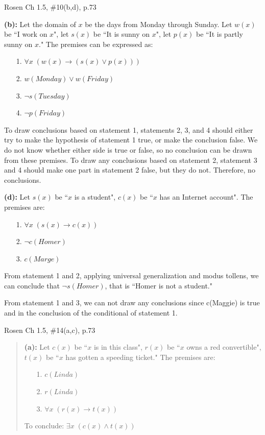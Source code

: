 \documentclass[12pt]{exam}
\begin{document}
\begin{questions}
\question[12] Rosen Ch 1.5, \#10(b,d), p.73
    \begin{solution}
    \textbf{(b):} Let the domain of $x$ be the days from Monday through Sunday.  Let $w(x)$ be ``I work on $x$", let $s(x)$ be ``It is sunny on $x$", let $p(x)$ be ``It is partly sunny on $x$."  The premises can be expressed as:
    \begin{itemize}
        \item[1.] $\forall x\; (w(x) \rightarrow (s(x) \vee p(x)))$
        \item[2.] $w(Monday) \vee w(Friday)$
        \item[3.] $\neg s(Tuesday)$
        \item[4.] $\neg p(Friday)$
    \end{itemize}
    \smallskip
    To draw conclusions based on statement 1, statements 2, 3, and 4 should either try to make the hypothesis of statement 1 true, or make the conclusion false.  We do not know whether either side is true or false, so no conclusion can be drawn from these premises.  To draw any conclusions based on statement 2, statement 3 and 4 should make one part in statement 2 false, but they do not.  Therefore, no conclusions.

    \medskip
    \textbf{(d):} Let $s(x)$ be ``$x$ is a student", $c(x)$ be ``$x$ has an Internet account".  The premises are:
    \begin{itemize}
        \item[1.] $\forall x\; (s(x) \rightarrow c(x))$
        \item[2.] $\neg c(Homer)$
        \item[3.] $c(Marge)$
    \end{itemize}
    \smallskip
    From statement 1 and 2, applying universal generalization and modus tollens, we can conclude that $\neg s(Homer)$, that is ``Homer is not a student."

    From statement 1 and 3, we can not draw any conclusions since c(Maggie) is true and in the conclusion of the conditional of statement 1.
    \end{solution}


\question[12] Rosen Ch 1.5, \#14(a,c), p.73
\begin{solution}
\begin{quote}
    \textbf{(a):} Let $c(x)$ be ``$x$ is in this class", $r(x)$ be ``$x$ owns a red convertible", $t(x)$ be ``$x$ has gotten a speeding ticket."  The premises are:
    \begin{itemize}
        \item[1.] $c(Linda)$
        \item[2.] $r(Linda)$
        \item[3.] $\forall x\; (r(x) \rightarrow t(x))$
    \end{itemize}
    To conclude: $\exists x\; (c(x) \wedge t(x))$


\end{quote}
\end{solution}
\end{questions}
\end{document}
